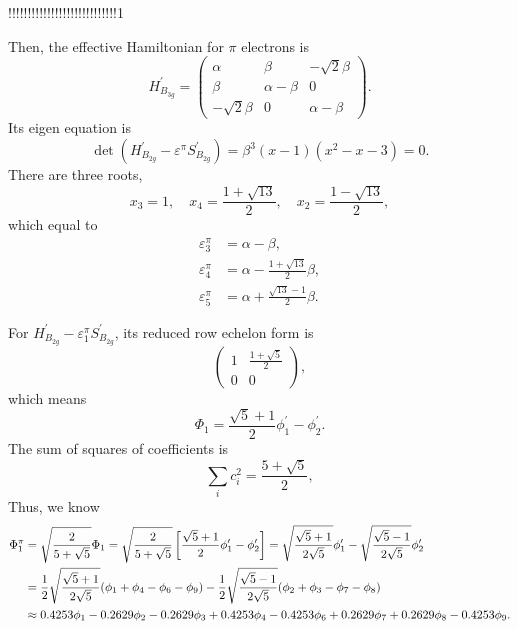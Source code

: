 \documentclass[a4paper]{book}
\newcommand{\Hp}{H^\prime}
\newcommand{\Sp}{S^\prime}
\begin{document}
\begin{solution}
\begin{enumerate}[label=(\alph*)]
		!!!!!!!!!!!!!!!!!!!!!!!!!!!!1
		
		Then, the effective Hamiltonian for $\pi$ electrons is
		\begin{equation*}
			H^\prime_{B_{3g}} = \begin{pmatrix}
				\alpha	&	\beta	&	-\sqrt{2}\beta	\\
				\beta	&	\alpha-\beta	&	0		\\
				-\sqrt{2}\beta	&	0	&\alpha-\beta
				\end{pmatrix}.				
		\end{equation*}
		Its eigen equation is		
		\begin{equation*}
			\det(\Hp_{B_{2g}}-\varepsilon^\pi \Sp_{B_{2g}}) = \beta^3 (x-1)( x^2 - x - 3 ) = 0.
		\end{equation*}
		There are three roots,
		\begin{equation*}
			x_3 = 1, \quad x_4 = \frac{1+\sqrt{13}}{2}, \quad x_2 = \frac{1-\sqrt{13}}{2},
		\end{equation*}
		which equal to
		\begin{align}
			\varepsilon^\pi_3 &= \alpha - \beta, \\
			\varepsilon^\pi_4 &= \alpha - \frac{1+\sqrt{13}}{2}\beta, \\
			\varepsilon^\pi_5 &= \alpha + \frac{\sqrt{13}-1}{2}\beta.
		\end{align}
		
		For $\Hp_{B_{2g}}-\varepsilon^\pi_1 \Sp_{B_{2g}}$, its reduced row echelon form is
		\begin{equation*}
			\begin{pmatrix}
				1	& \frac{1+\sqrt{5}}{2}	\\	0	&	0
			\end{pmatrix},
		\end{equation*}
		which means
		\begin{equation*}
			\Phi_1 = \frac{\sqrt{5}+1}{2}\phi^\prime_1 - \phi^\prime_2.
		\end{equation*}
		The sum of squares of coefficients is
		\begin{equation*}
			\sum_{i} c^2_i = \frac{ 5+\sqrt{5} }{2},
		\end{equation*}
		Thus, we know
		\begin{align}
			\Phi^\pi_1 &= \sqrt{ \frac{2}{5+\sqrt{5}} } \Phi_1 = \sqrt{ \frac{2}{5+\sqrt{5}} } \left[ \frac{\sqrt{5}+1}{2}\phi^\prime_1 - \phi^\prime_2 \right] = \sqrt{\frac{\sqrt{5}+1}{2\sqrt{5}}} \phi^\prime_1 - \sqrt{\frac{\sqrt{5}-1}{2\sqrt{5}}} \phi^\prime_2	\notag \\
			&= \frac{1}{2}\sqrt{\frac{\sqrt{5}+1}{2\sqrt{5}}} (\phi_1 + \phi_4 - \phi_6 - \phi_9) - \frac 12 \sqrt{\frac{\sqrt{5}-1}{2\sqrt{5}}} (\phi_2 + \phi_3 - \phi_7 - \phi_8)\notag \\
			&\approx 0.4253 \phi_1 - 0.2629 \phi_2 - 0.2629 \phi_3 + 0.4253 \phi_4 - 0.4253\phi_6 + 0.2629\phi_7 + 0.2629\phi_8 - 0.4253 \phi_9.
		\end{align}
		

\end{enumerate}
\end{solution}
\end{document}
